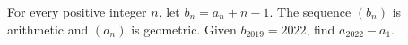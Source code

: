 For every positive integer $n$, let $b_n=a_n+n-1$. The sequence $(b_n)$ is arithmetic and $(a_n)$ is geometric. Given $b_{2019}=2022$, find $a_{2022}-a_1$.
